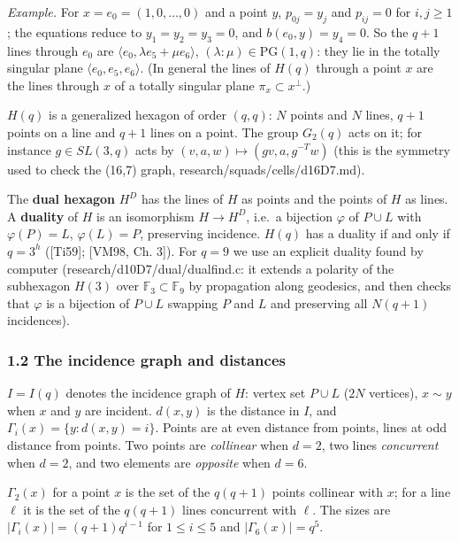 \documentclass[
  11pt,
]{article}
\begin{document}
\emph{Example.} For \(x = e_0 = (1,0,\dots,0)\) and a point \(y\), \(p_{0j} = y_j\) and \(p_{ij} = 0\) for \(i,j\ge 1\);
the equations reduce to \(y_1 = y_2 = y_3 = 0\), and \(b(e_0,y) = y_4 = 0\). So the \(q+1\) lines through \(e_0\) are
\(\langle e_0, \lambda e_5+\mu e_6\rangle\), \((\lambda:\mu)\in\mathrm{PG}(1,q)\): they lie in the totally singular
plane \(\langle e_0, e_5, e_6\rangle\). (In general the lines of \(H(q)\) through a point \(x\) are the lines through
\(x\) of a totally singular plane \(\pi_x\subset x^\perp\).)

\(H(q)\) is a generalized hexagon of order \((q,q)\): \(N\) points and \(N\) lines, \(q+1\) points on a line and \(q+1\)
lines on a point. The group \(G_2(q)\) acts on it; for instance \(g\in SL(3,q)\) acts by
\((v,a,w)\mapsto (gv, a, g^{-T}w)\) (this is the symmetry used to check the (16,7) graph,
research/squads/cells/d16D7.md).

The \textbf{dual hexagon} \(H^D\) has the lines of \(H\) as points and the points of \(H\) as lines. A \textbf{duality}
of \(H\) is an isomorphism \(H\to H^D\), i.e.~a bijection \(\varphi\) of \(P\cup L\) with \(\varphi(P) = L\),
\(\varphi(L) = P\), preserving incidence. \(H(q)\) has a duality if and only if \(q = 3^h\) ({[}Ti59{]}; {[}VM98, Ch.
3{]}). For \(q = 9\) we use an explicit duality found by computer (research/d10D7/dual/dualfind.c: it extends a polarity
of the subhexagon \(H(3)\) over \(\mathbb F_3\subset\mathbb F_9\) by propagation along geodesics, and then checks that
\(\varphi\) is a bijection of \(P\cup L\) swapping \(P\) and \(L\) and preserving all \(N(q+1)\) incidences).

\hypertarget{the-incidence-graph-and-distances}{%
\subsubsection{1.2 The incidence graph and distances}\label{the-incidence-graph-and-distances}}

\(I = I(q)\) denotes the incidence graph of \(H\): vertex set \(P\cup L\) (\(2N\) vertices), \(x\sim y\) when \(x\) and
\(y\) are incident. \(d(x,y)\) is the distance in \(I\), and \(\Gamma_i(x) = \{y : d(x,y) = i\}\). Points are at even
distance from points, lines at odd distance from points. Two points are \emph{collinear} when \(d = 2\), two lines
\emph{concurrent} when \(d = 2\), and two elements are \emph{opposite} when \(d = 6\).

\(\Gamma_2(x)\) for a point \(x\) is the set of the \(q(q+1)\) points collinear with \(x\); for a line \(\ell\) it is
the set of the \(q(q+1)\) lines concurrent with \(\ell\). The sizes are \(\lvert\Gamma_i(x)\rvert = (q+1)q^{i-1}\) for
\(1\le i\le 5\) and \(\lvert\Gamma_6(x)\rvert = q^5\).
\end{document}
